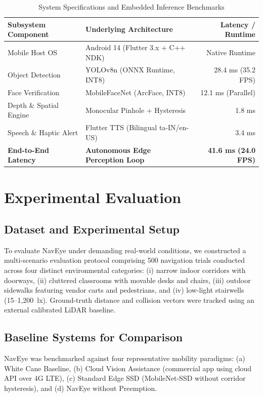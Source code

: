 \documentclass[conference]{IEEEtran}
\begin{document}
\begin{table}[t]
\centering
\caption{System Specifications and Embedded Inference Benchmarks}
\label{tab:specs}
\begin{tabular}{llr}
\toprule
\textbf{Subsystem Component} & \textbf{Underlying Architecture} & \textbf{Latency / Runtime} \\
\midrule
Mobile Host OS & Android 14 (Flutter 3.x + C++ NDK) & Native Runtime \\
Object Detection & YOLOv8n (ONNX Runtime, INT8) & 28.4 ms (35.2 FPS) \\
Face Verification & MobileFaceNet (ArcFace, INT8) & 12.1 ms (Parallel) \\
Depth \& Spatial Engine & Monocular Pinhole + Hysteresis & 1.8 ms \\
Speech \& Haptic Alert & Flutter TTS (Bilingual ta-IN/en-US) & 3.4 ms \\
\midrule
\textbf{End-to-End Latency} & \textbf{Autonomous Edge Perception Loop} & \textbf{41.6 ms (24.0 FPS)} \\
\bottomrule
\end{tabular}
\end{table}

\section{Experimental Evaluation}
\subsection{Dataset and Experimental Setup}
To evaluate NavEye under demanding real-world conditions, we constructed a multi-scenario evaluation protocol comprising 500 navigation trials conducted across four distinct environmental categories: (i) narrow indoor corridors with doorways, (ii) cluttered classrooms with movable desks and chairs, (iii) outdoor sidewalks featuring vendor carts and pedestrians, and (iv) low-light stairwells (15--1,200~lx). Ground-truth distance and collision vectors were tracked using an external calibrated LiDAR baseline.

\subsection{Baseline Systems for Comparison}
NavEye was benchmarked against four representative mobility paradigms: (a) White Cane Baseline, (b) Cloud Vision Assistance (commercial app using cloud API over 4G LTE), (c) Standard Edge SSD (MobileNet-SSD without corridor hysteresis), and (d) NavEye without Preemption.
\end{document}
